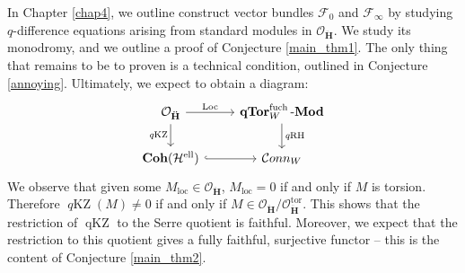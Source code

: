 \documentclass[a4paper]{report}
\theoremstyle{theorem}
\theoremstyle{definition}
\theoremstyle{remark}
\theoremstyle{proposition}
\theoremstyle{conjecture}
\theoremstyle{lemma}
\newtheorem{lemma}{Lemma}
\theoremstyle{corollary}
\theoremstyle{exercise}
\theoremstyle{example}
\newcommand{\mcal}{\mathcal}
\newcommand{\on}{\operatorname}
\newcommand{\coh}{\on{\mathbf{Coh}}}
\newcommand{\lmod}{\on{\mathbf{-Mod}}}
\newcommand{\qTor}{\on{\mathbf{qTor}}}
\newcommand{\qKZ}{\on{\mathit{q}KZ}}
\newcommand{\qRH}{\on{\mathit{q}RH}}
\newcommand{\dyn}{{\on{dyn}}}
\begin{document}
  In Chapter \ref{chap4}, we outline construct vector bundles $\mcal{F}_0$ and $\mcal{F}_\infty$ 
  by studying $q$-difference equations arising from
  standard modules in $\mcal{O}_{\mathbf{\ddot{\mathbf{H}}}}$. We study its monodromy, and we outline a proof of Conjecture \ref{main_thm1}. 
  The only thing that remains to be to proven is a technical condition, outlined in Conjecture \ref{annoying}. 
  Ultimately, we expect to obtain a diagram:
  $$\begin{tikzcd}
  \mcal{O}_{\mathbf{\ddot{\mathbf{H}}}} \arrow[r, "\on{Loc}"] \arrow[d, "\qKZ"'] & \qTor_W^{\on{fuch}}\lmod \arrow[d, "\qRH"] \\
  \coh(\mcal{H}^{\on{ell}}) \arrow[r, hook]                           & \mcal{C}onn_W                                       
  \end{tikzcd}$$
  We observe that given some $M_{\on{loc}} \in \mcal{O}_{\mathbf{\ddot{\mathbf{H}}}}$,
  $M_{\on{loc}} = 0$ if and only if $M$ is torsion. Therefore 
  $\qKZ(M) \neq 0$ if and only if $M \in \mcal{O}_{\mathbf{\ddot{\mathbf{H}}}}/\mcal{O}_{\ddot{\mathbf{H}}}^{\on{tor}}$.
  This shows that the restriction of $\on{qKZ}$ to the Serre quotient is faithful. Moreover, we expect that the restriction to this 
  quotient gives a fully faithful, surjective functor -- this is the content of Conjecture \ref{main_thm2}.\\\\
  
\end{document}
